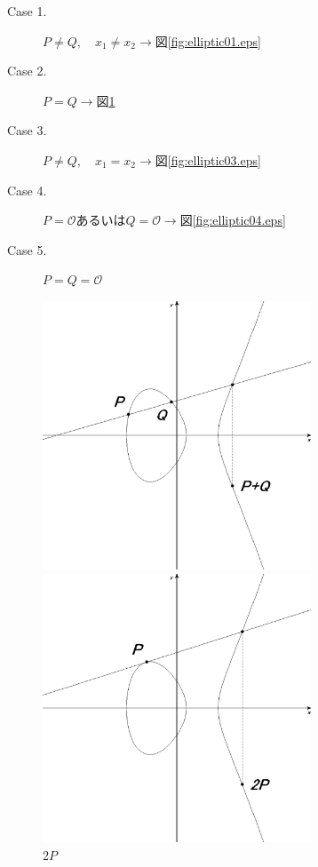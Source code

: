 \begin{description}
\item[Case 1.] $P\not=Q,\quad x_1\not=x_2 \longrightarrow$図\ref{fig:elliptic01.eps}
\item[Case 2.] $P=Q\longrightarrow $図\ref{fig:elliptic02.eps}
\item[Case 3.] $P\not=Q,\quad x_1=x_2\longrightarrow $図\ref{fig:elliptic03.eps}
\item[Case 4.] $P=\mathcal{O}$あるいは$Q=\mathcal{O}\longrightarrow $図\ref{fig:elliptic04.eps}
\item[Case 5.] $P=Q=\mathcal{O}$
\end{description}


\begin{figure}[htbp]
  \begin{minipage}{0.5\hsize}
    \begin{center}
      \includegraphics[width=80mm]{elliptic01.eps}
    \end{center}
    \caption{$P+Q$}
    \label{fig:elliptic01.eps}
  \end{minipage}
  \begin{minipage}{0.5\hsize}
    \begin{center}
      \includegraphics[width=80mm]{elliptic02.eps}
    \end{center}
    \caption{$2P$}
    \label{fig:elliptic02.eps}
  \end{minipage}
\end{figure}

